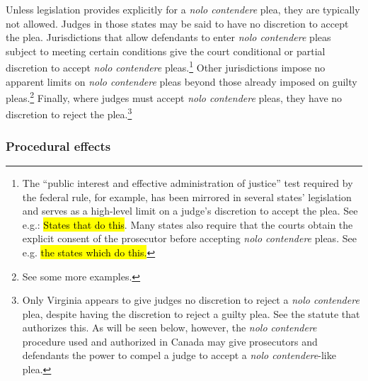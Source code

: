 Unless legislation provides explicitly for a \textit{nolo contendere} plea, they are typically not allowed. Judges in those states may be said to have no discretion to accept the plea. Jurisdictions that allow defendants to enter \textit{nolo contendere} pleas subject to meeting certain conditions give the court conditional or partial discretion to accept \textit{nolo contendere} pleas.\footnote{The ``public interest and effective administration of justice” test required by the federal rule, for example, has been mirrored in several states' legislation and serves as a high-level limit on a judge's discretion to accept the plea. See e.g.: \hl{States that do this}. Many states also require that the courts obtain the explicit consent of the prosecutor before accepting \textit{nolo contendere} pleas. See e.g. \hl{the states which do this.}} Other jurisdictions impose no apparent limits on \textit{nolo contendere} pleas beyond those already imposed on guilty pleas.\footnote{See some more examples.} Finally, where judges must accept \textit{nolo contendere} pleas, they have no discretion to reject the plea.\footnote{Only Virginia appears to give judges no discretion to reject a \textit{nolo contendere} plea, despite having the discretion to reject a guilty plea. See the statute that authorizes this. As will be seen below, however, the \textit{nolo contendere} procedure used and authorized in Canada may give prosecutors and defendants the power to compel a judge to accept a \textit{nolo contendere}-like plea.}

\subsubsection{Procedural effects}

